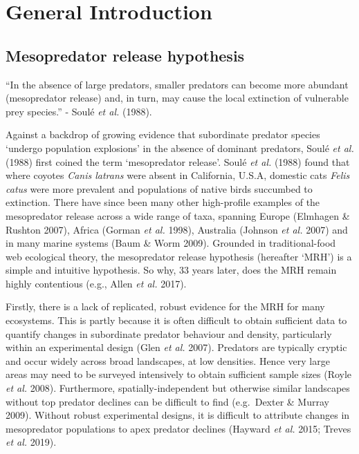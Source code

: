 \documentclass[11pt,a4paper,titlepage,twoside,openright]{style/unimelbthesis}
\begin{document}
\begin{mainmatter}

\hypertarget{general-introduction}{%
\chapter{General Introduction}\label{general-introduction}}

\hypertarget{mesopredator-release-hypothesis}{%
\section{Mesopredator release hypothesis}\label{mesopredator-release-hypothesis}}

``In the absence of large predators, smaller predators can become more abundant (mesopredator release) and, in turn, may cause the local extinction of vulnerable prey species.'' - Soulé \emph{et al.} (1988).

Against a backdrop of growing evidence that subordinate predator species `undergo population explosions' in the absence of dominant predators, Soulé \emph{et al.} (1988) first coined the term `mesopredator release'. Soulé \emph{et al.} (1988) found that where coyotes \emph{Canis latrans} were absent in California, U.S.A, domestic cats \emph{Felis catus} were more prevalent and populations of native birds succumbed to extinction. There have since been many other high-profile examples of the mesopredator release across a wide range of taxa, spanning Europe (Elmhagen \& Rushton 2007), Africa (Gorman \emph{et al.} 1998), Australia (Johnson \emph{et al.} 2007) and in many marine systems (Baum \& Worm 2009). Grounded in traditional-food web ecological theory, the mesopredator release hypothesis (hereafter `MRH') is a simple and intuitive hypothesis. So why, 33 years later, does the MRH remain highly contentious (e.g., Allen \emph{et al.} 2017).

Firstly, there is a lack of replicated, robust evidence for the MRH for many ecosystems. This is partly because it is often difficult to obtain sufficient data to quantify changes in subordinate predator behaviour and density, particularly within an experimental design (Glen \emph{et al.} 2007). Predators are typically cryptic and occur widely across broad landscapes, at low densities. Hence very large areas may need to be surveyed intensively to obtain sufficient sample sizes (Royle \emph{et al.} 2008). Furthermore, spatially-independent but otherwise similar landscapes without top predator declines can be difficult to find (e.g.~Dexter \& Murray 2009). Without robust experimental designs, it is difficult to attribute changes in mesopredator populations to apex predator declines (Hayward \emph{et al.} 2015; Treves \emph{et al.} 2019).


\end{mainmatter}
\end{document}
